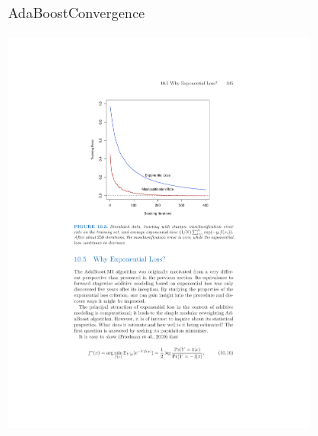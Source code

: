 \documentclass[handout]{beamer}
\begin{document}
\begin{frame}{AdaBoost}{Convergence}
\begin{center}
	\includegraphics[width=0.6\textwidth]{figs/adaboost_expLoss}
	\\
	\cite{HastieEtAl2009}
\end{center}
\end{frame}
\end{document}

